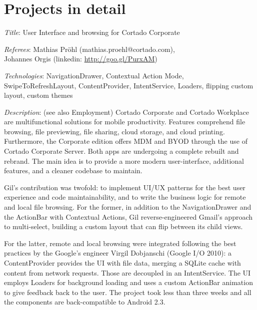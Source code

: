 \documentclass[letterpaper]{article}
\renewenvironment{itemize}{
  \begin{list}{}{
    \setlength{\leftmargin}{1.5em}
  }
}{
  \end{list}
}
\newenvironment{itemize1}{
  \begin{list}{}{
    \setlength{\leftmargin}{0em}
  }
}{
  \end{list}
}
\begin{document}
\section*{Projects in detail}
\begin{itemize1}
\item
\begin{itemize}
\item {\it Title}: User Interface and browsing for Cortado Corporate 
\item {\it Referees}: Mathias Pr\"ohl (mathias.proehl@cortado.com),\\\phantom{xxxxxxx.}Johannes Orgis (linkedin: \url{http://goo.gl/PurxAM})
\item {\it Technologies}: NavigationDrawer, Contextual Action Mode, SwipeToRefreshLayout, ContentProvider, IntentService, Loaders, flipping custom layout, custom themes

\item {\it Description}: (see also Employment) 
Cortado Corporate and Cortado Workplace are multifunctional solutions for mobile productivity. Features comprehend file browsing, file previewing, file sharing, cloud storage, and cloud printing. Furthermore, the Corporate edition offers MDM and BYOD through the use of Cortado Corporate Server. Both apps are undergoing a complete rebuilt and rebrand. The main idea is to provide a more modern user-interface, additional features, and a cleaner codebase to maintain.
\medskip

Gil's contribution was twofold: to implement UI/UX patterns for the best user experience and code maintainability, and to write the business logic for remote and local file browsing. 
For the former, in addition to the NavigationDrawer and the ActionBar with Contextual Actions, Gil reverse-engineered Gmail's approach to multi-select, building a custom layout that can flip between its child views. 
\medskip

For the latter, remote and local browsing were integrated following the best practices by the Google's engineer Virgil Dobjanschi (Google I/O 2010): a ContentProvider provides the UI with file data, merging a SQLite cache with content from network requests. Those are decoupled in an IntentService. The UI employs Loaders for background loading and uses a custom ActionBar animation to give feedback back to the user. The project took less than three weeks and all the components are back-compatible to Android 2.3.
\end{itemize}

\bigskip


\end{itemize1}
\end{document}
